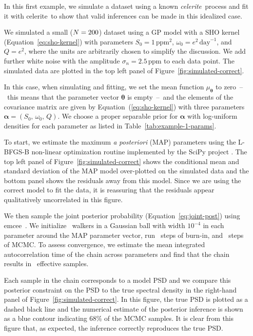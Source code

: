 \documentclass[manuscript, letterpaper]{aastex6}
\makeatletter
\let\origsubsection\subsection
\renewcommand\subsection{\@ifstar{\starsubsection}{\nostarsubsection}}
\newcommand\nostarsubsection[1]{\subsectionprelude\origsubsection{#1}}
\newcommand\starsubsection[1]{\subsectionprelude\origsubsection*{#1}}
\newcommand\subsectionprelude{\vspace{1em}}
\newcommand{\project}[1]{\textsf{#1}}
\newcommand{\celerite}{\project{celerite}}
\newcommand{\celeriteterm}{\emph{celerite}}
\newcommand{\emcee}{\project{emcee}}
\newcommand{\figureref}[1]{\ref{fig:#1}}
\newcommand{\Figure}[1]{Figure~\figureref{#1}}
\renewcommand{\eqref}[1]{\ref{eq:#1}}
\newcommand{\Eq}[1]{Equation~(\eqref{#1})}
\newcommand{\eq}[1]{\Eq{#1}}
\newcommand{\eqalt}[1]{Equation~\eqref{#1}}
\newcommand{\bvec}[1]{{\ensuremath{\boldsymbol{#1}}}}
\newcommand{\response}[1]{{\color{blue}#1}}
\makeatother
\begin{document}
\subsection{Example 1: Recovery of a celerite process}

In this first example, we simulate a dataset using a known \celeriteterm\
process and fit it with \celerite\ to show that valid inferences can be made
in this idealized case.
\response{We simulated a small ($N = 200$) dataset using a GP model
with a SHO kernel (\eqalt{sho-kernel}) with parameters $S_0 =
1\,\mathrm{ppm}^2$, $\omega_0 = e^2\,\mathrm{day}^{-1}$, and $Q = e^2$, where
the units are arbitrarily chosen to simplify the discussion.
We add further white noise with the amplitude $\sigma_n = 2.5\, \mathrm{ppm}$
to each data point.
The simulated data are plotted in the top left panel of
\Figure{simulated-correct}.

In this case, when simulating and fitting, we set the mean function
$\mu_\bvec{\theta}$ to zero~--~this means that the parameter vector
$\bvec{\theta}$ is empty~--~and the elements of the covariance matrix are
given by \eq{sho-kernel} with three parameters $\bvec{\alpha} = (S_0,\,
\omega_0,\,Q)$.
We choose a proper separable prior for $\bvec{\alpha}$ with log-uniform
densities for each parameter as listed in Table~\ref{tab:example-1-params}.

To start, we estimate the maximum \emph{a posteriori} (MAP) parameters using
the \project{L-BFGS-B} non-linear optimization routine \citep{Byrd:1995,
Zhu:1997} implemented by the \project{SciPy} project \citep{Jones:2001}.
The top left panel of \Figure{simulated-correct} shows the conditional mean
and standard deviation of the MAP model over-plotted on the simulated data and
the bottom panel shows the residuals away from this model.
Since we are using the correct model to fit the data, it is reassuring that
the residuals appear qualitatively uncorrelated in this figure.

We then sample the joint posterior probability (\eqalt{joint-post}) using
\emcee\ \citep{Goodman:2010, Foreman-Mackey:2013}.
We initialize \exampleinwalkers~walkers in a Gaussian ball with width
$10^{-4}$ in each parameter around the MAP parameter vector, run
\exampleinburn~steps of burn-in, and \exampleinsteps~steps of MCMC.
To assess convergence, we estimate the mean integrated autocorrelation time of
the chain across parameters \citep{Sokal:1989, Goodman:2010} and find that the
chain results in \exampleineff~effective samples.

Each sample in the chain corresponds to a model PSD and we compare this
posterior constraint on the PSD to the true spectral density in the
right-hand panel of \Figure{simulated-correct}.
In this figure, the true PSD is plotted as a dashed black line and the
numerical estimate of the posterior inference is shown as a blue contour
indicating 68\% of the MCMC samples.
It is clear from this figure that, as expected, the inference correctly
reproduces the true PSD.
}
\end{document}
